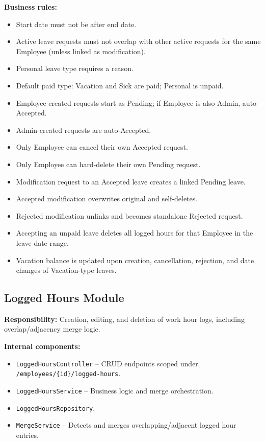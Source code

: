 \documentclass[11pt,a4paper]{article}
\begin{document}
\textbf{Business rules:}
\begin{itemize}[leftmargin=1.5em]
    \item Start date must not be after end date.
    \item Active leave requests must not overlap with other active requests for the same Employee (unless linked as modification).
    \item Personal leave type requires a reason.
    \item Default paid type: Vacation and Sick are paid; Personal is unpaid.
    \item Employee-created requests start as Pending; if Employee is also Admin, auto-Accepted.
    \item Admin-created requests are auto-Accepted.
    \item Only Employee can cancel their own Accepted request.
    \item Only Employee can hard-delete their own Pending request.
    \item Modification request to an Accepted leave creates a linked Pending leave.
    \item Accepted modification overwrites original and self-deletes.
    \item Rejected modification unlinks and becomes standalone Rejected request.
    \item Accepting an unpaid leave deletes all logged hours for that Employee in the leave date range.
    \item Vacation balance is updated upon creation, cancellation, rejection, and date changes of Vacation-type leaves.
\end{itemize}

\subsection{Logged Hours Module}

\textbf{Responsibility:} Creation, editing, and deletion of work hour logs, including overlap/adjacency merge logic.

\textbf{Internal components:}
\begin{itemize}[leftmargin=1.5em]
    \item \texttt{LoggedHoursController} -- CRUD endpoints scoped under \texttt{/employees/\{id\}/logged-hours}.
    \item \texttt{LoggedHoursService} -- Business logic and merge orchestration.
    \item \texttt{LoggedHoursRepository}.
    \item \texttt{MergeService} -- Detects and merges overlapping/adjacent logged hour entries.
\end{itemize}
\end{document}
